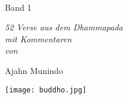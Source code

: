 \cleartorecto
\thispagestyle{empty}

\vspace*{1em}

{\centering

\\[0.4\baselineskip]
Band 1


\vfill

{\itshape 52 Verse aus dem Dhammapada\\
mit Kommentaren\\
von}

\vfill

Ajahn Munindo

\vfill

\texttt{[image: buddho.jpg]}
\vspace*{1.0em}


}
